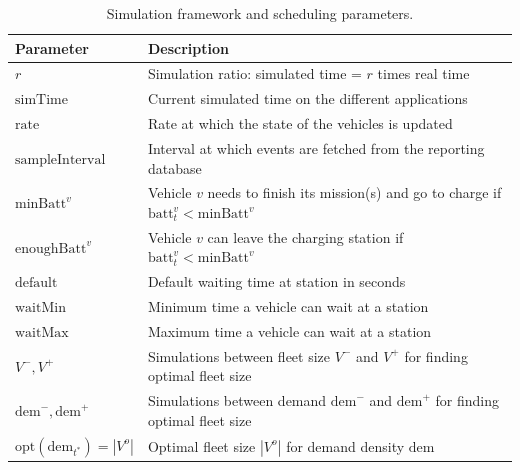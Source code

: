 \documentclass[12pt,a4paper]{article}
\begin{document}
\begin{table}

  \centering
\begin{tabularx}{\linewidth}{| l | Y |} 
  \hline			
 Parameter & Description \\
\hline	  
  $r$ & Simulation ratio: simulated time = $r$ times real time\\
  $\text{simTime}$ & Current simulated time on the different applications \\
  $\text{rate}$ & Rate at which the state of the vehicles is updated \\
  $\text{sampleInterval}$ & Interval at which events are fetched from the reporting database \\
  $\text{minBatt}^{v}$ & Vehicle $v$ needs to finish its mission(s) and go to charge if $\text{batt}^{v}_{t} < \text{minBatt}^{v}$\\
  $\text{enoughBatt}^{v} $& Vehicle $v$ can leave the charging station if $\text{batt}^{v}_{t} < \text{minBatt}^{v}$\\
  $\text{default}$ & Default waiting time at station in seconds\\
    $\text{waitMin}$ & Minimum time a vehicle can wait at a station\\
  $\text{waitMax}$ & Maximum time a vehicle can wait at a station\\
  $V^{-}, V^{+}$ & Simulations between fleet size $V^{-}$ and $V^{+}$ for finding optimal fleet size \\
    $\text{dem}^{-}, \text{dem}^{+}$ & Simulations between demand $\text{dem}^{-}$ and $\text{dem}^{+}$ for finding optimal fleet size \\
    $\text{opt}(\text{dem}_{t^{*}}) = | V^{o}|$ & Optimal fleet size $|V^{o}|$ for demand density $\text{dem}$ \\
  
  \hline  
\end{tabularx}

\caption{Simulation framework and scheduling parameters.}
\label{table:simparameters}
\end{table}
\end{document}
